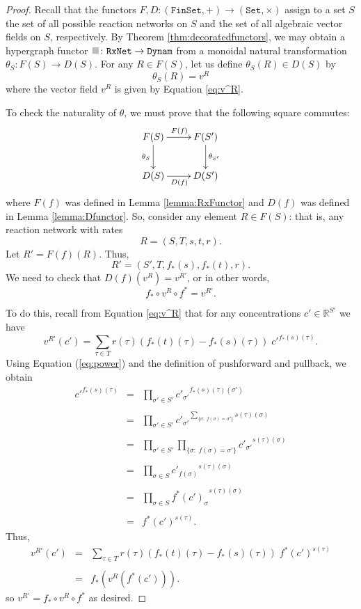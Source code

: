 \documentclass{compositionalityarticle}
\newcommand{\R}{\mathbb{R}}
\newcommand{\FinSet}{\mathtt{FinSet}}
\newcommand{\Set}{\mathtt{Set}}
\newcommand{\RxNet}{\mathtt{RxNet}}
\newcommand{\Dynam}{\mathtt{Dynam}}
\newcommand*{\graysquare}{\textcolor{lightgray}{\blacksquare}}
\newcommand{\maps}{\colon}
\theoremstyle{plain}
\theoremstyle{remark}
\begin{document}
\begin{proof}
Recall that the functors $F,D \maps (\FinSet,+) \to (\Set,\times)$ assign to a set $S$ the set of all possible reaction networks on $S$ and the set of all algebraic vector fields on $S$, respectively.  By Theorem \ref{thm:decoratedfunctors}, we may obtain a hypergraph functor $\graysquare \maps \RxNet \to \Dynam$ from a monoidal natural transformation $\theta_S \maps F(S) \to D(S)$.    For any $R \in F(S)$, let us define $\theta_S(R) \in D(S)$ by
\[  \theta_S(R) = v^R \]
where the vector field $v^R$ is given by Equation \ref{eq:v^R}.

To check the naturality of $\theta$, we must prove that the following square commutes:
\[  \xymatrix{   F(S) \ar_{\theta_S}[d] \ar^{F(f)}[r] & F(S') \ar^{\theta_{S'} }[d] \\
D(S) \ar_{D(f)}[r] & D(S') } \]
where $F(f)$ was defined in Lemma \ref{lemma:RxFunctor} and $D(f)$ was defined in Lemma \ref{lemma:Dfunctor}.   So, consider any element $R \in F(S)$: that is, any reaction network with 
rates 
\[    R = (S,T,s,t,r) .\]
Let $R' = F(f)(R)$.   Thus,
\[   R' = (S',T,f_*(s),f_*(t),r).\]
We need to check that $D(f)(v^R) = v^{R'}$, or in other words,
\[    f_* \circ v^R \circ f^* = v^{R'}  .\]

To do this, recall from Equation \ref{eq:v^R} that for any concentrations $c' \in \R^{S'}$ we have
\[    v^{R'}(c') = \sum_{\tau \in T} r(\tau) (f_*(t)(\tau) - f_*(s)(\tau)) \;{c'}^{f_*(s)(\tau)} .\]
Using Equation (\ref{eq:power}) and the definition of pushforward and pullback, we obtain
\[  
\begin{array}{ccl}
{c'}^{f_*(s)(\tau)} &=& \displaystyle{\prod_{\sigma' \in S'} {c'_{\sigma'}}^{f_*(s)(\tau)(\sigma')} }
\\ \\ 
&=& \displaystyle{ \prod_{\sigma' \in S'} {c'_{\sigma'}}^{\sum_{\{\sigma : \; f(\sigma) = \sigma'\}} s(\tau)(\sigma)} } \\ \\
&=& \displaystyle{ \prod_{\sigma' \in S'}  \prod_{\{\sigma : \; f(\sigma) = \sigma'\}} 
{c'_{\sigma'}}^{s(\tau)(\sigma)} } \\ \\
&=& \displaystyle{  \prod_{\sigma \in S} {c'_{f(\sigma)}}^{s(\tau)(\sigma)} }  \\ \\
&=& \displaystyle{  \prod_{\sigma \in S} {f^*(c')_\sigma}^{s(\tau)(\sigma)} }  \\ \\
&=& f^*(c')^{s(\tau)} .
\end{array} 
\]
Thus, 
\[
\begin{array}{ccl}
   v^{R'}(c') &=&
\displaystyle{ \sum_{\tau \in T} r(\tau) (f_*(t)(\tau) - f_*(s)(\tau))  \; f^*(c')^{s(\tau)} } \\ \\
&=& f_*(v^R (f^*(c'))) .
\end{array}
\]
so $v^{R'} = f_* \circ v^R \circ f^*$ as desired.


\end{proof}
\end{document}
